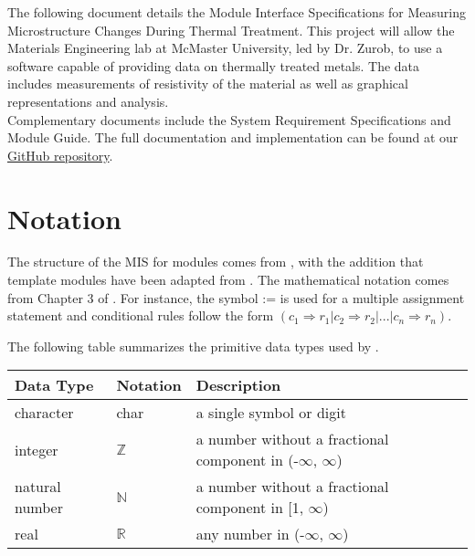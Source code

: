 \documentclass[12pt, titlepage]{article}
\begin{document}
\noindent The following document details the Module Interface Specifications for Measuring Microstructure Changes During Thermal Treatment. This project will allow the Materials Engineering lab at McMaster University, led by Dr. Zurob, to use a software capable of providing data on thermally treated metals. The data includes measurements of resistivity of the material as well as graphical representations and analysis. \\

\noindent Complementary documents include the System Requirement Specifications and Module Guide. The full documentation and implementation can be found at our \href{https://github.com/edwin-do/capstoneTeam30}{GitHub repository}.

\section{Notation}


The structure of the MIS for modules comes from \citet{HoffmanAndStrooper1995},
with the addition that template modules have been adapted from
\cite{GhezziEtAl2003}.  The mathematical notation comes from Chapter 3 of
\citet{HoffmanAndStrooper1995}.  For instance, the symbol := is used for a
multiple assignment statement and conditional rules follow the form $(c_1
\Rightarrow r_1 | c_2 \Rightarrow r_2 | ... | c_n \Rightarrow r_n )$.

The following table summarizes the primitive data types used by \progname. 

\begin{center}
\renewcommand{\arraystretch}{1.2}
\noindent 
\begin{tabular}{l l p{7.5cm}} 
\toprule 
\textbf{Data Type} & \textbf{Notation} & \textbf{Description}\\ 
\midrule
character & char & a single symbol or digit\\
integer & $\mathbb{Z}$ & a number without a fractional component in (-$\infty$, $\infty$) \\
natural number & $\mathbb{N}$ & a number without a fractional component in [1, $\infty$) \\
real & $\mathbb{R}$ & any number in (-$\infty$, $\infty$)\\
\bottomrule
\end{tabular} 
\end{center}
\end{document}
